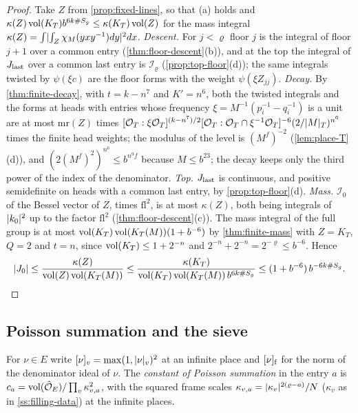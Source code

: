 \begin{proof}
Take $Z$ from \cref{prop:fixed-lines}, so that (a) holds and $\kappa(Z)\operatorname{vol}(K_T)b^{6k\#S_g}\le\kappa(K_T)\operatorname{vol}(Z)$ for the mass integral $\kappa(Z)=\int\lvert \int_Z\chi_M(yxy^{-1})dy\rvert^2dx$. \emph{Descent.} For $j<\varrho$ floor $j$ is
the integral of floor $j+1$ over a common entry (\cref{thm:floor-descent}(b)), and at the top the integral of $J_{\rm last}$ over a common last entry is $\mathcal I_\varrho$ (\cref{prop:top-floor}(d)); the same integrals twisted by
$\psi(\xi c)$ are the floor forms with the weight $\psi(\xi Z_{jj})$. \emph{Decay.} By \cref{thm:finite-decay}, with $t=k-n^7$ and $K'=n^6$, both the twisted integrals and the forms at heads with entries whose frequency
$\xi=M^{-1}(p_i^{-1}-q_i^{-1})$ is a unit are at most $\mathrm{mr}(Z)$ times $[\mathcal{O}_T:\xi\mathcal{O}_T]^{(k-n^7)/2}[\mathcal{O}_T:\mathcal{O}_T\cap\xi^{-1}\mathcal{O}_T]^{-6}(2/\lvert M\rvert_T)^{n^6}$ times the finite head weights; the modulus of the level is $(M^f)^{-2}$
(\cref{lem:place-T}(d)), and $(2(M^f)^2)^{n^6}\le b^{n^9f}$ because $M\le b^{23}$; the decay keeps only the third power of the index of the denominator. \emph{Top.} $J_{\rm last}$ is continuous, and positive semidefinite on heads with a
common last entry, by \cref{prop:top-floor}(d). \emph{Mass.} $\mathcal I_0$ of the Bessel vector of $Z$, times $\mathrm{fl}^2$, is at most $\kappa(Z)$, both being integrals of $\lvert k_0\rvert^2$ up to the factor $\mathrm{fl}^2$
(\cref{thm:floor-descent}(c)). The mass integral of the full group is at most $\operatorname{vol}(K_T)\operatorname{vol}(K_T(M))(1+b^{-6})$ by \cref{thm:finite-mass} with $Z=K_T$, $Q=2$ and $t=n$, since $\operatorname{vol}(K_T)\le1+2^{-n}$ and $2^{-n}+2^{-n}=2^{-\varrho}\le b^{-6}$.
Hence
\[
  \lvert J_0\rvert\le\frac{\kappa(Z)}{\operatorname{vol}(Z)\operatorname{vol}(K_T(M))}\le\frac{\kappa(K_T)}{\operatorname{vol}(K_T)\operatorname{vol}(K_T(M))\,b^{6k\#S_g}}\le(1+b^{-6})\,b^{-6k\#S_g}.
\]
\end{proof}

\subsection{Poisson summation and the sieve}\label{ss:sieve}
For $\nu\in E$ write $[\nu]_v=\max(1,\lvert \nu\rvert_v)^2$ at an infinite place and $[\nu]_{\rm f}$ for the norm of the denominator ideal of $\nu$. The \emph{constant of Poisson summation} in the entry $a$ is
$c_a=\operatorname{vol}(\hat{\mathcal{O}}_E)/\prod_v\kappa_{v,a}^2$, with the squared frame scales $\kappa_{v,a}=\lvert \kappa_v\rvert^{2(\varrho-a)}/N$ ($\kappa_v$ as in \cref{ss:filling-data}) at the infinite places.

